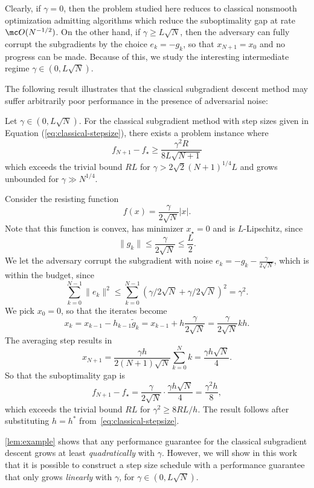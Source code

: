 \documentclass{article}
\begin{document}
Clearly, if $\gamma=0$, then the problem studied here reduces to classical nonsmooth optimization admitting algorithms which reduce the suboptimality gap at rate $\mc O(N^{-1/2})$. On the other hand, if $\gamma\ge L\sqrt{N}$, then the adversary can fully corrupt the subgradients by the choice $e_k=-g_k$, so that $x_{N+1}=x_0$ and no progress can be made.
Because of this, we study the interesting intermediate regime $\gamma\in(0, L\sqrt{N})$.

The following result illustrates that the classical subgradient descent method may suffer arbitrarily poor performance in the presence of adversarial noise:
\begin{lemma}\label{lem:example}
    Let $\gamma\in(0,L\sqrt N)$.
    For the classical subgradient method with step sizes given in Equation (\ref{eq:classical-stepsize}), there exists a problem instance where
    \[
    f_{N+1}-f_\star\ge\frac{\gamma^2R}{8L\sqrt{N+1}}
    \]
    which exceeds the trivial bound $RL$ for $\gamma>2\sqrt2(N+1)^{1/4}L$ and grows unbounded for $\gamma\gg N^{1/4}$.
\end{lemma}
\begin{appendixproof}
    Consider the resisting function
\[
f(x)=\frac{\gamma}{2\sqrt{N}}|x|.
\]
Note that this function is convex, has minimizer $x_\star=0$ and is $L$-Lipschitz, since
\[
\|g_k\|\le\frac{\gamma}{2\sqrt{N}}\le \frac{L}{2}.
\]
We let the adversary corrupt the subgradient with noise $e_k=-g_k-\frac{\gamma}{2\sqrt{N}}$, which is within the budget, since
\[
\sum_{k=0}^{N-1}\|e_k\|^2\le\sum_{k=0}^{N-1}(\gamma/2\sqrt{N}+\gamma/2\sqrt{N})^2=\gamma^2. 
\]
We pick $x_0=0$, so that the iterates become
\[
x_k=x_{k-1}-h_{k-1}\tilde g_k=x_{k-1}+h\frac{\gamma}{2\sqrt N}=\frac{\gamma}{2\sqrt{N}}kh.
\]
The averaging step results in
\[
x_{N+1}=\frac{\gamma h}{2(N+1)\sqrt{N}}\sum_{k=0}^{N}k=\frac{\gamma h\sqrt{N}}{4}.
\]
So that the suboptimality gap is 
\[
f_{N+1}-f_\star=\frac{\gamma}{2\sqrt{N}}\cdot \frac{\gamma h\sqrt{N}}{4}=\frac{\gamma^2 h}{8},
\]
which exceeds the trivial bound $RL$ for $\gamma^2\ge 8RL/h$. 
The result follows after substituting $h=h^*$ from~\eqref{eq:classical-stepsize}.
\end{appendixproof}
\cref{lem:example} shows that any performance guarantee for the classical subgradient descent grows at least \emph{quadratically} with $\gamma$. However, we will show in this work that it is possible to construct a step size schedule with a performance guarantee that only grows \emph{linearly} with $\gamma$, for $\gamma\in(0,L\sqrt{N})$.
\end{document}
